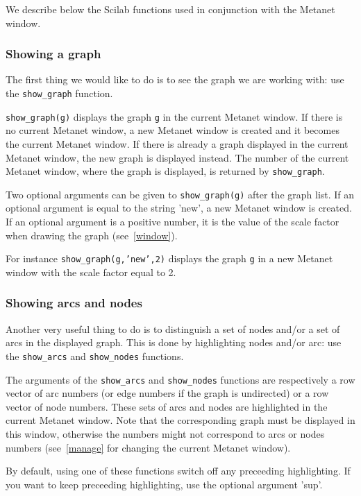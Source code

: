 \documentclass[11pt]{article}
\newcommand{\func}[1]{\texttt{#1}}
\begin{document}
We describe below the Scilab functions used in
conjunction with the Metanet window.

\subsubsection{Showing a graph}

The first thing we would like to do is to see the graph we are working
with: use the \func{show\_graph} function.

\texttt{show\_graph(g)} displays the graph \texttt{g} in the current
Metanet window. 
If there is no current Metanet window, a new Metanet window is created
and it becomes the current Metanet window.
If there is already a graph displayed in the current Metanet window,
the new graph is displayed instead. The number of the current Metanet
window, where the graph is displayed, is returned by \func{show\_graph}.

Two optional arguments can be given to \texttt{show\_graph(g)} after
the graph list.
If an optional argument is equal to the string 'new', a new 
Metanet window is created.
If an optional argument is a positive number, it is the value of the
scale factor when drawing the graph (see~\ref{window}).

For instance \texttt{show\_graph(g,'new',2)} displays the graph
\texttt{g} in a new Metanet window with the scale factor equal to 2.

\subsubsection{Showing arcs and nodes}

Another very useful thing to do is to distinguish a set of nodes
and/or a set of arcs in the displayed graph. This is done by
highlighting nodes and/or arc: use the \func{show\_arcs} and
\func{show\_nodes} functions.

The arguments of the \func{show\_arcs} and
\func{show\_nodes} functions are respectively a row vector of arc numbers (or
edge numbers if the graph is undirected) or a row vector of node
numbers. These sets of arcs and nodes are highlighted in the
current Metanet window. Note that the corresponding graph must be displayed in
this window, otherwise the numbers might not correspond to arcs or
nodes numbers (see~\ref{manage} for changing the current Metanet window).

By default, using one of these functions switch off any preceeding
highlighting. If you want to keep preceeding highlighting, use the
optional argument 'sup'.
\end{document}
